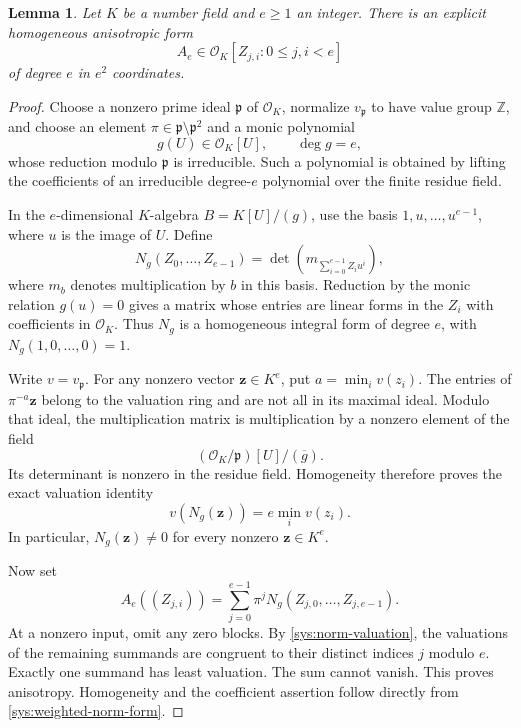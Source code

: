 \documentclass[11pt,a4paper]{article}
\newtheorem{lemma}[theorem]{Lemma}
\theoremstyle{definition}
\begin{document}
\begin{lemma}\label{sys:anisotropic-form}
Let $K$ be a number field and $e\ge1$ an integer. There is an
explicit homogeneous anisotropic form
\[
       A_e\in\mathcal O_K[Z_{j,i}:0\le j,i<e]
\]
of degree $e$ in $e^2$ coordinates.
\end{lemma}
\begin{proof}
Choose a nonzero prime ideal $\mathfrak p$ of $\mathcal O_K$,
normalize $v_{\mathfrak p}$ to have value group $\mathbb Z$,
and choose an element $\pi\in\mathfrak p\setminus\mathfrak p^2$ and a
monic polynomial
\[
              g(U)\in\mathcal O_K[U],\qquad \deg g=e,
\]
whose reduction modulo $\mathfrak p$ is irreducible. Such a
polynomial is obtained by lifting the coefficients of an
irreducible degree-$e$ polynomial over the finite residue field.

In the $e$-dimensional $K$-algebra $B=K[U]/(g)$, use the basis
$1,u,\ldots,u^{e-1}$, where $u$ is the image of $U$. Define
\[
 N_g(Z_0,\ldots,Z_{e-1})
   =\det\left(m_{\sum_{i=0}^{e-1}Z_i u^i}\right),
\]
where $m_b$ denotes multiplication by $b$ in this basis.
Reduction by the monic relation $g(u)=0$ gives a matrix whose
entries are linear forms in the $Z_i$ with coefficients in
$\mathcal O_K$. Thus $N_g$ is a homogeneous integral form of
degree $e$, with $N_g(1,0,\ldots,0)=1$.

Write $v=v_{\mathfrak p}$. For any nonzero vector
$\mathbf z\in K^e$, put $a=\min_i v(z_i)$. The entries of
$\pi^{-a}\mathbf z$ belong to the valuation ring and are not
all in its maximal ideal. Modulo that ideal, the multiplication
matrix is multiplication by a nonzero element of the field
\[
          (\mathcal O_K/\mathfrak p)[U]/(\overline g).
\]
Its determinant is nonzero in the residue field. Homogeneity
therefore proves the exact valuation identity
\begin{equation}\label{sys:norm-valuation}
                    v(N_g(\mathbf z))=e\min_i v(z_i).
\end{equation}
In particular, $N_g(\mathbf z)\ne0$ for every nonzero
$\mathbf z\in K^e$.

Now set
\begin{equation}\label{sys:weighted-norm-form}
 A_e((Z_{j,i}))
    =\sum_{j=0}^{e-1}\pi^j N_g(Z_{j,0},\ldots,Z_{j,e-1}).
\end{equation}
At a nonzero input, omit any zero blocks. By
\eqref{sys:norm-valuation}, the valuations of the remaining
summands are congruent to their distinct indices $j$ modulo $e$.
Exactly one summand has least valuation. The sum cannot vanish.
This proves anisotropy. Homogeneity and the coefficient assertion
follow directly from \eqref{sys:weighted-norm-form}.
\end{proof}
\end{document}
